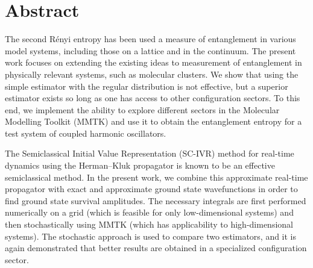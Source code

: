 \chapter*{Abstract}

The second Rényi entropy has been used a measure of entanglement in various model systems, including those on a lattice and in the continuum.
The present work focuses on extending the existing ideas to measurement of entanglement in physically relevant systems, such as molecular clusters.
We show that using the simple estimator with the regular distribution is not effective, but a superior estimator exists so long as one has access to other configuration sectors.
To this end, we implement the ability to explore different sectors in the Molecular Modelling Toolkit (MMTK) and use it to obtain the entanglement entropy for a test system of coupled harmonic oscillators.

The Semiclassical Initial Value Representation (SC-IVR) method for real-time dynamics using the Herman--Kluk propagator is known to be an effective semiclassical method.
In the present work, we combine this approximate real-time propagator with exact and approximate ground state wavefunctions in order to find ground state survival amplitudes.
The necessary integrals are first performed numerically on a grid (which is feasible for only low-dimensional systems) and then stochastically using MMTK (which has applicability to high-dimensional systems).
The stochastic approach is used to compare two estimators, and it is again demonstrated that better results are obtained in a specialized configuration sector.
